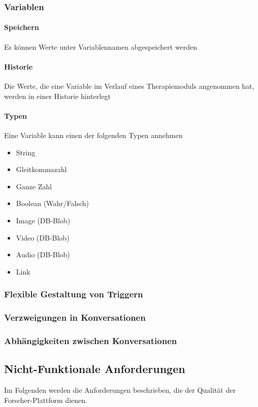 \subsubsection{Variablen}
\paragraph{Speichern}Es können Werte unter Variablennamen abgespeichert werden
\paragraph{Historie}Die Werte, die eine Variable im Verlauf eines Therapiemoduls angenommen hat, werden in einer Historie hinterlegt
\paragraph{Typen} Eine Variable kann einen der folgenden Typen annehmen
\begin{itemize}
\item String
\item Gleitkommazahl
\item Ganze Zahl 
\item Boolean (Wahr/Falsch)
\item Image (DB-Blob)
\item Video (DB-Blob)
\item Audio (DB-Blob)
\item Link
\end{itemize}	

\subsubsection{Flexible Gestaltung von Triggern}

\subsubsection{Verzweigungen in Konversationen}

\subsubsection{Abhängigkeiten zwischen Konversationen}


\subsection{Nicht-Funktionale Anforderungen}
Im Folgenden werden die Anforderungen beschrieben, die der Qualität der Forscher-Plattform dienen.

